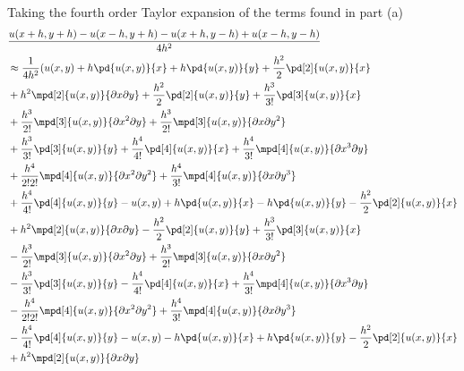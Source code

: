 \documentclass[11pt]{article}
\begin{document}
\begin{enumerate}
\begin{enumerate}
            Taking the fourth order Taylor expansion of the terms found in part (a)
            \begin{align*}
                &\frac{u(x+h, y+h) - u(x-h, y+h) - u(x+h, y-h) + u(x-h, y-h)}{4h^2} \\
                &\approx \frac{1}{4h^2} (u(x,y) + h\pd{u(x,y)}{x} + h\pd{u(x,y)}{y}
                    + \frac{h^2}{2} \pd[2]{u(x,y)}{x} \\
                    &+ h^2\mpd[2]{u(x,y)}{\partial x \partial y}
                    + \frac{h^2}{2}\pd[2]{u(x,y)}{y}
                    + \frac{h^3}{3!}\pd[3]{u(x,y)}{x} \\
                    &+ \frac{h^3}{2!} \mpd[3]{u(x,y)}{\partial x^2 \partial y}
                    + \frac{h^3}{2!} \mpd[3]{u(x,y)}{\partial x \partial y^2} \\
                    &+ \frac{h^3}{3!} \pd[3]{u(x,y)}{y}
                    + \frac{h^4}{4!} \pd[4]{u(x,y)}{x}
                    + \frac{h^4}{3!} \mpd[4]{u(x,y)}{\partial x^3 \partial y} \\
                    &+ \frac{h^4}{2! 2!} \mpd[4]{u(x,y)}{\partial x^2 \partial y^2}
                    + \frac{h^4}{3!} \mpd[4]{u(x,y)}{\partial x \partial y^3} \\
                    &+ \frac{h^4}{4!} \pd[4]{u(x,y)}{y} - 
                    u(x,y) + h\pd{u(x,y)}{x} - h\pd{u(x,y)}{y}
                    - \frac{h^2}{2} \pd[2]{u(x,y)}{x} \\
                    &+ h^2\mpd[2]{u(x,y)}{\partial x \partial y}
                    - \frac{h^2}{2}\pd[2]{u(x,y)}{y}
                    + \frac{h^3}{3!}\pd[3]{u(x,y)}{x} \\
                    &- \frac{h^3}{2!} \mpd[3]{u(x,y)}{\partial x^2 \partial y}
                    + \frac{h^3}{2!} \mpd[3]{u(x,y)}{\partial x \partial y^2} \\
                    &- \frac{h^3}{3!} \pd[3]{u(x,y)}{y}
                    - \frac{h^4}{4!} \pd[4]{u(x,y)}{x}
                    + \frac{h^4}{3!} \mpd[4]{u(x,y)}{\partial x^3 \partial y} \\
                    &- \frac{h^4}{2! 2!} \mpd[4]{u(x,y)}{\partial x^2 \partial y^2}
                    + \frac{h^4}{3!} \mpd[4]{u(x,y)}{\partial x \partial y^3} \\
                    &- \frac{h^4}{4!} \pd[4]{u(x,y)}{y} - u(x,y) - h\pd{u(x,y)}{x} + h\pd{u(x,y)}{y}
                    - \frac{h^2}{2} \pd[2]{u(x,y)}{x} \\
                    &+ h^2\mpd[2]{u(x,y)}{\partial x \partial y}

\end{align*}
\end{enumerate}
\end{enumerate}
\end{document}
